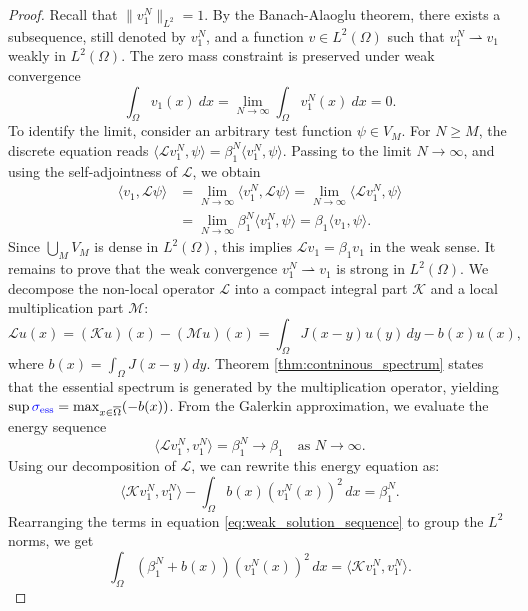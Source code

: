 \documentclass[12pt, a4paper]{article}
\newcommand{\revision}[1]{\textcolor{blue}{#1}}
\theoremstyle{break}
\theoremstyle{break}
\theoremstyle{break}
\theoremstyle{break}
\theoremstyle{break}
\theoremstyle{break}
\theoremstyle{break}
\theoremstyle{break}
\theoremstyle{break}
\begin{document}
\begin{proof}
    Recall that $\|v_1^N\|_{L^2} = 1$. By the Banach-Alaoglu theorem, there exists a subsequence, still denoted by $v_1^N$, and a function $v \in L^2(\Omega)$ such that $v_1^N \rightharpoonup v_1$ weakly in $L^2(\Omega)$. The zero mass constraint is preserved under weak convergence
    \begin{equation}
        \int_\Omega v_1(x) \:dx = \lim_{N \to \infty} \int_\Omega v_1^N(x) \:dx = 0.
    \end{equation}
    To identify the limit, consider an arbitrary test function $\psi \in V_M$. For $N \geq M$, the discrete equation reads $\langle \mathcal{L} v_1^N, \psi \rangle = \beta_1^N \langle v_1^N, \psi \rangle$. Passing to the limit $N \to \infty$, and using the self-adjointness of $\mathcal{L}$, we obtain
    \begin{align}
        \langle v_1, \mathcal{L} \psi \rangle &= \lim_{N \to \infty} \langle v_1^N, \mathcal{L} \psi \rangle = \lim_{N \to \infty} \langle \mathcal{L} v_1^N, \psi \rangle \\
        &= \lim_{N \to \infty} \beta_1^N \langle v_1^N, \psi \rangle = \beta_1 \langle v_1, \psi \rangle.
    \end{align}
    Since $\bigcup_{M} V_M$ is dense in $L^2(\Omega)$, this implies $\mathcal{L} v_1 = \beta_1 v_1$ in the weak sense. It remains to prove that the weak convergence $v_1^N \rightharpoonup v_1$ is strong in $L^2(\Omega)$. We decompose the non-local operator $\mathcal{L}$ into a compact integral part $\mathcal{K}$ and a local multiplication part $\mathcal{M}$:
    \begin{equation}
        \mathcal{L}u(x) = (\mathcal{K}u)(x) - (\mathcal{M}u)(x) = \int_\Omega J(x-y)u(y)\,dy - b(x)u(x),
    \end{equation}
    where $b(x) = \int_\Omega J(x-y)dy$. Theorem \ref{thm:contninous_spectrum} states that the essential spectrum is generated by the multiplication operator, yielding $\sup \revision{\sigma_{\mathrm{ess}}} = \max_{x \in \overline{\Omega}} (-b(x))$. From the Galerkin approximation, we evaluate the energy sequence
    \begin{equation}
        \langle \mathcal{L} v_1^N, v_1^N \rangle = \beta_1^N \to \beta_1 \quad \text{as } N \to \infty.
    \end{equation}
    Using our decomposition of $\mathcal{L}$, we can rewrite this energy equation as:
    \begin{equation}
        \label{eq:weak_solution_sequence}
        \langle \mathcal{K} v_1^N, v_1^N \rangle - \int_\Omega b(x) (v_1^N(x))^2 \, dx = \beta_1^N.
    \end{equation}
    Rearranging the terms in equation \eqref{eq:weak_solution_sequence} to group the $L^2$ norms, we get
    \begin{equation} \label{eq:rearranged_energy}
        \int_\Omega (\beta_1^N + b(x)) (v_1^N(x))^2 \, dx = \langle \mathcal{K} v_1^N, v_1^N \rangle.
    \end{equation}
    

\end{proof}
\end{document}
